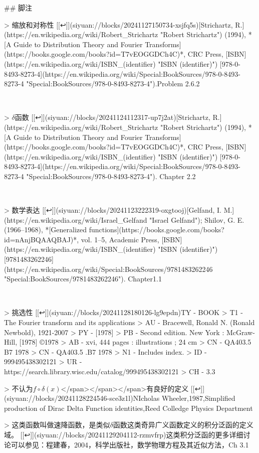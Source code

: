 \documentclass[lang=cn,10pt,newtx,bibend=biber,device=pad]{elegantbook}
\begin{document}
## 脚注

> 缩放和对称性 [[↩️]](siyuan://blocks/20241127150734-xsjfq5s)​[Strichartz, R.](https://en.wikipedia.org/wiki/Robert_Strichartz "Robert Strichartz") (1994), *[A Guide to Distribution Theory and Fourier Transforms](https://books.google.com/books?id=T7vEOGGDCh4C)*, CRC Press, [ISBN](https://en.wikipedia.org/wiki/ISBN_(identifier) "ISBN (identifier)") [978-0-8493-8273-4](https://en.wikipedia.org/wiki/Special:BookSources/978-0-8493-8273-4 "Special:BookSources/978-0-8493-8273-4").Problem 2.6.2

​

> $\delta$函数 [[↩️]](siyuan://blocks/20241124112317-up7j2at)​[Strichartz, R.](https://en.wikipedia.org/wiki/Robert_Strichartz "Robert Strichartz") (1994), *[A Guide to Distribution Theory and Fourier Transforms](https://books.google.com/books?id=T7vEOGGDCh4C)*, CRC Press, [ISBN](https://en.wikipedia.org/wiki/ISBN_(identifier) "ISBN (identifier)") [978-0-8493-8273-4](https://en.wikipedia.org/wiki/Special:BookSources/978-0-8493-8273-4 "Special:BookSources/978-0-8493-8273-4"). Chapter 2.2

​

> 数学表达 [[↩️]](siyuan://blocks/20241123222319-oxgtooj)​[Gelfand, I. M.](https://en.wikipedia.org/wiki/Israel_Gelfand "Israel Gelfand"); Shilov, G. E. (1966–1968), *[Generalized functions](https://books.google.com/books?id=nAnjBQAAQBAJ)*, vol. 1–5, Academic Press, [ISBN](https://en.wikipedia.org/wiki/ISBN_(identifier) "ISBN (identifier)") [9781483262246](https://en.wikipedia.org/wiki/Special:BookSources/9781483262246 "Special:BookSources/9781483262246"). Chapter1.1

​

> 挑选性 [[↩️]](siyuan://blocks/20241128180126-lg9epdn)TY  - BOOK  
> T1  - The Fourier transform and its applications  
> AU  - Bracewell, Ronald N. (Ronald Newbold), 1921-2007  
> PY  - [1978]  
> PB  - Second edition. New York : McGraw-Hill, [1978] ©1978  
> AB  - xvi, 444 pages : illustrations ; 24 cm  
> CN  - QA403.5 B7 1978  
> CN  - QA403.5 .B7 1978  
> N1  - Includes index.  
> ID  - 999495438302121  
> UR  - https://search.library.wisc.edu/catalog/999495438302121  
> CH - 3.3



> 不认为$f\circ \delta(x)$</span></span>﻿</span>有良好的定义 [[↩️]](siyuan://blocks/20241128224546-sce3z1l)NIcholas Wheeler,1987,Simplified production of Dirac Delta Function identities,Reed Colledge Physics Department
‍

> 这类函数叫做速降函数，是类似$\delta$函数这类奇异广义函数定义的积分泛函的定义域。 [[↩️]](siyuan://blocks/20241129204112-rzmvfrp)这类积分泛函的更多详细讨论可以参见：程建春，2004，科学出版社，数学物理方程及其近似方法，Ch 3.1
\end{document}

